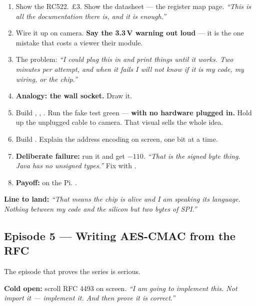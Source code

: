 \begin{enumerate}
  \item Show the RC522. \pounds3. Show the datasheet --- the register map page.
        \emph{``This is all the documentation there is, and it is enough.''}
  \item Wire it up on camera. \textbf{Say the 3.3\,V warning out loud} --- it is
        the one mistake that costs a viewer their module.
  \item The problem: \emph{``I could plug this in and print things until it
        works. Two minutes per attempt, and when it fails I will not know if it
        is my code, my wiring, or the chip.''}
  \item \textbf{Analogy: the wall socket.} Draw it.
  \item Build , , . Run the
        fake test green --- \textbf{with no hardware plugged in.} Hold up the
        unplugged cable to camera. That visual sells the whole idea.
  \item Build . Explain the address encoding on screen, one bit
        at a time.
  \item \textbf{Deliberate failure:} run it and get $-110$. \emph{``That is the
        signed byte thing. Java has no unsigned types.''} Fix with .
  \item \textbf{Payoff:} on the Pi. .
\end{enumerate}

\textbf{Line to land:} \emph{``That  means the chip is alive and I am
speaking its language. Nothing between my code and the silicon but two bytes of
SPI.''}

\subsection{Episode 5 --- Writing AES-CMAC from the RFC}

The episode that proves the series is serious.

\textbf{Cold open:} scroll RFC 4493 on screen. \emph{``I am going to implement
this. Not import it --- implement it. And then prove it is correct.''}

